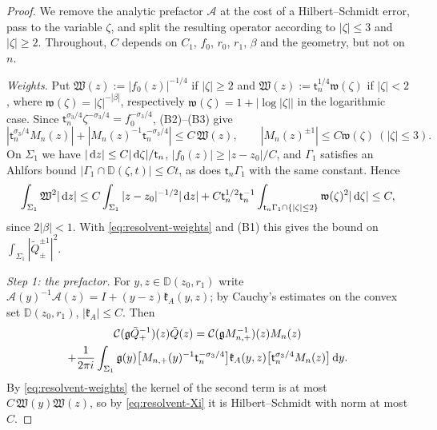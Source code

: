 \begin{proof}
We remove the analytic prefactor $\mathcal A$ at the cost of a Hilbert--Schmidt error, pass to the variable $\zeta$, and split the
resulting operator according to $|\zeta|\le3$ and $|\zeta|\ge2$. Throughout, $C$ depends on $C_1$, $f_0$, $r_0$, $r_1$,
$\beta$ and the geometry, but not on $n$.

\emph{Weights.} Put $\mathfrak W(z):=|f_0(z)|^{-1/4}$ if $|\zeta|\ge2$ and $\mathfrak W(z):=\mathsf t_n^{1/4}\mathfrak w(\zeta)$ if $|\zeta|<2$, where
$\mathfrak w(\zeta)=|\zeta|^{-|\beta|}$, respectively $\mathfrak w(\zeta)=1+|\log|\zeta||$ in the logarithmic case. Since
$\mathsf t_n^{\sigma_3/4}\zeta^{-\sigma_3/4}=f_0^{-\sigma_3/4}$, (B2)--(B3) give
\begin{equation}\label{eq:resolvent-weights}
  |\mathsf t_n^{\sigma_3/4}M_n(z)|+|M_n(z)^{-1}\mathsf t_n^{-\sigma_3/4}|\le C\,\mathfrak W(z),\qquad |M_n(z)^{\pm1}|\le C\mathfrak w(\zeta)\ (|\zeta|\le3).
\end{equation}
On $\Sigma_1$ we have $|\,\mathrm{d} z|\le C|\,\mathrm{d}\zeta|/\mathsf t_n$, $|f_0(z)|\ge|z-z_0|/C$, and $\Gamma_1$ satisfies an Ahlfors bound
$|\Gamma_1\cap \mathbb D(\zeta,t)|\le Ct$, as does $\mathsf t_n\Gamma_1$ with the same constant. Hence
\begin{equation}\label{eq:resolvent-Xi}
  \int_{\Sigma_1}\mathfrak W^2|\,\mathrm{d} z|\le C\int_{\Sigma_1}|z-z_0|^{-1/2}|\,\mathrm{d} z|+C\mathsf t_n^{1/2}\mathsf t_n^{-1}\int_{\mathsf t_n\Gamma_1\cap\{|\zeta|\le2\}}
  \mathfrak w(\zeta)^2|\,\mathrm{d}\zeta|\le C,
\end{equation}
since $2|\beta|<1$. With \eqref{eq:resolvent-weights} and (B1) this gives the bound on $\int_{\Sigma_1}|\tilde Q_\pm^{\pm1}|^2$.

\emph{Step 1: the prefactor.} For $y,z\in \mathbb D(z_0,r_1)$ write $\mathcal A(y)^{-1}\mathcal A(z)=I+(y-z)\mathfrak k_A(y,z)$; by Cauchy's
estimates on the convex set $\mathbb D(z_0,r_1)$, $|\mathfrak k_A|\le C$. Then
\begin{multline*}
  \mathcal{C}(\mathfrak g\tilde Q_+^{-1})(z)\tilde Q(z)=\mathcal{C}(\mathfrak gM_{n,+}^{-1})(z)M_n(z)\\
  +\frac1{2\pi i}\int_{\Sigma_1}\mathfrak g(y)\bigl[M_{n,+}(y)^{-1}\mathsf t_n^{-\sigma_3/4}\bigr]\mathfrak k_A(y,z)
  \bigl[\mathsf t_n^{\sigma_3/4}M_n(z)\bigr]\,\mathrm{d} y .
\end{multline*}
By \eqref{eq:resolvent-weights} the kernel of the second term is at most $C\,\mathfrak W(y)\mathfrak W(z)$, so by \eqref{eq:resolvent-Xi} it is
Hilbert--Schmidt with norm at most $C$.


\end{proof}
